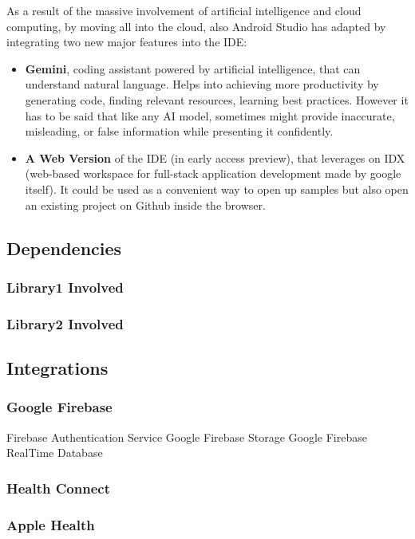As a result of the massive involvement of artificial intelligence and cloud computing, by moving all into the cloud, also Android Studio has adapted by integrating two new major features into the IDE\cite{AndroidStudioNewFeatures}:
\vspace{2ex}
\begin{itemize}[nosep] %
    \item \textbf{Gemini}, coding assistant powered by artificial intelligence, that can understand natural language. Helps into achieving more productivity by generating code, finding relevant resources, learning best practices. However it has to be said that like any AI model, sometimes might provide inaccurate, misleading, or false information while presenting it confidently. \vspace{2ex}
    \item \textbf{A Web Version} of the IDE (in early access preview), that leverages on IDX (web-based workspace for full-stack application development made by google itself). It could be used as a convenient way to open up samples but also open an existing project on Github inside the browser. \vspace{2ex}
\end{itemize}

\subsection{Dependencies}
\subsubsection{Library1 Involved}
\subsubsection{Library2 Involved}
\subsection{Integrations}
\subsubsection{Google Firebase}
Firebase Authentication Service
Google Firebase Storage
Google Firebase RealTime Database
\subsubsection{Health Connect}
\subsubsection{Apple Health}